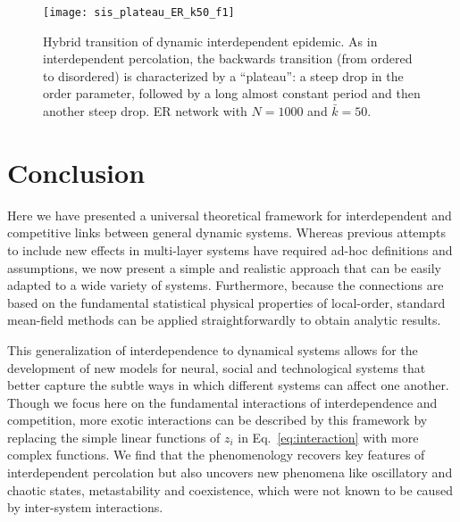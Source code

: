 \documentclass[pre,twocolumn,superscriptaddress]{revtex4}
\newcommand{\kk}{\bar{k}}
\newcommand{\1}{\mathds{1}}
\begin{document}
{\begin{figure}
    \centering
    \texttt{[image: sis\_plateau\_ER\_k50\_f1]}
    \caption{Hybrid transition of dynamic interdependent epidemic. As in interdependent percolation, the backwards transition (from ordered to disordered) is characterized by a ``plateau'': a steep drop in the order parameter, followed by a long almost constant period and then another steep drop. ER network with $N=1000$ and $\kk = 50$.}
    \label{fig:plateau}
\end{figure}



\section{Conclusion}
Here we have presented a universal theoretical framework for interdependent and competitive links between general dynamic systems.
Whereas previous attempts to include new effects in multi-layer systems have required ad-hoc definitions and assumptions, we now present a simple and realistic approach that can be easily adapted to a wide variety of systems.
Furthermore, because the connections are based on the fundamental statistical physical properties of local-order, standard mean-field methods can be applied straightforwardly to obtain analytic results.

This generalization of interdependence to dynamical systems allows for the development of new models for neural, social and technological systems that better capture the subtle ways in which different systems can affect one another.
Though we focus here on the fundamental interactions of interdependence and competition, more exotic interactions can be described by this framework by replacing the simple linear functions of $z_i$ in Eq.~\ref{eq:interaction} with more complex functions.
We find that the phenomenology recovers  key features of interdependent percolation but also uncovers new phenomena like oscillatory and chaotic states, metastability and coexistence, which were not known to be caused by inter-system interactions.


}
\end{document}

